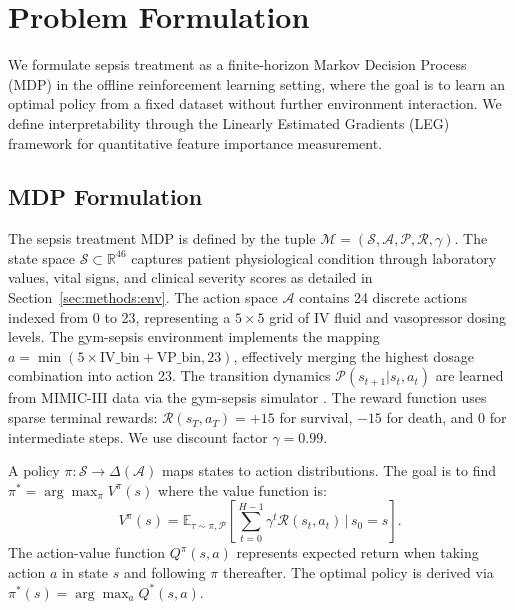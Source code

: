 
\section{Problem Formulation}\label{sec:problem}

We formulate sepsis treatment as a finite-horizon Markov Decision Process (MDP) in the offline reinforcement learning setting, where the goal is to learn an optimal policy from a fixed dataset without further environment interaction. We define interpretability through the Linearly Estimated Gradients (LEG) framework for quantitative feature importance measurement.

\subsection{MDP Formulation}\label{sec:problem:mdp}

The sepsis treatment MDP is defined by the tuple $\mathcal{M} = (\mathcal{S}, \mathcal{A}, \mathcal{P}, \mathcal{R}, \gamma)$. The state space $\mathcal{S} \subset \mathbb{R}^{46}$ captures patient physiological condition through laboratory values, vital signs, and clinical severity scores as detailed in Section~\ref{sec:methods:env}. The action space $\mathcal{A}$ contains 24 discrete actions indexed from 0 to 23, representing a $5 \times 5$ grid of IV fluid and vasopressor dosing levels. The gym-sepsis environment implements the mapping $a = \min(5 \times \text{IV\_bin} + \text{VP\_bin}, 23)$, effectively merging the highest dosage combination into action 23. The transition dynamics $\mathcal{P}(s_{t+1} | s_t, a_t)$ are learned from MIMIC-III data via the gym-sepsis simulator \citep{raghu2017sepsis_drl}. The reward function uses sparse terminal rewards: $\mathcal{R}(s_T, a_T) = +15$ for survival, $-15$ for death, and $0$ for intermediate steps. We use discount factor $\gamma = 0.99$.

A policy $\pi: \mathcal{S} \to \Delta(\mathcal{A})$ maps states to action distributions. The goal is to find $\pi^* = \arg\max_\pi V^\pi(s)$ where the value function is:
\begin{equation}
V^\pi(s) = \mathbb{E}_{\tau \sim \pi, \mathcal{P}} \left[ \sum_{t=0}^{H-1} \gamma^t \mathcal{R}(s_t, a_t) \,\Big|\, s_0 = s \right].
\end{equation}
The action-value function $Q^\pi(s, a)$ represents expected return when taking action $a$ in state $s$ and following $\pi$ thereafter. The optimal policy is derived via $\pi^*(s) = \arg\max_a Q^*(s, a)$.


